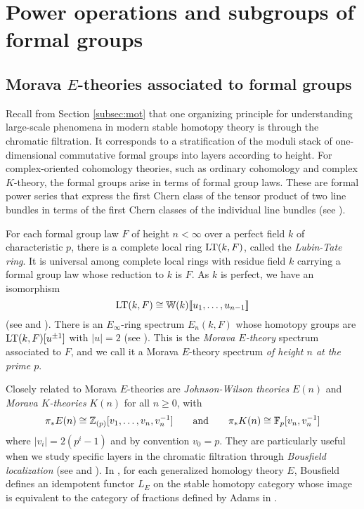 \documentclass{gtpart}
\theoremstyle{definition}
\theoremstyle{remark}
\newcommand{\mb}[1]{\mathbb{#1}}
\newcommand{\LT}{{\rm LT}}
\newcommand{\BF}{{\mb F}}
\newcommand{\BW}{{\mb W}}
\newcommand{\BZ}{{\mb Z}}
\newcommand{\ad}{{\rm and}}
\numberwithin{equation}{section}
\numberwithin{thm}{section}
\begin{document}
\section{Power operations and subgroups of formal groups}
\label{sec:fg}

\subsection{Morava $E$-theories associated to formal groups}
\label{subsec:E}

Recall from Section \ref{subsec:mot} that one organizing principle for 
understanding large-scale phenomena in modern stable homotopy theory is 
through the chromatic filtration.  It corresponds to a stratification of 
the moduli stack of one-dimensional commutative formal groups into 
layers according to height.  For complex-oriented cohomology theories, 
such as ordinary cohomology and complex $K$-theory, the formal groups 
arise in terms of formal group laws.  These are formal power series that 
express the first Chern class of the tensor product of two line bundles 
in terms of the first Chern classes of the individual line bundles (see 
\cite[Section 1]{coctalos}).  

For each formal group law $F$ of height $n<\infty$ over a perfect field 
$k$ of characteristic $p$, there is a complete local ring $\LT(k,F)$, 
called the {\em Lubin-Tate ring}.  It is universal among complete local 
rings with residue field $k$ carrying a formal group law whose reduction 
to $k$ is $F$.  As $k$ is perfect, we have an isomorphism 
\[
 \LT(k,F) \cong \BW(k) \llbracket u_1,\ldots,u_{n-1} \rrbracket 
\]
(see \cite{lubintate} and \cite[Sections 4.3 and 4.5]{Rnotes}).  There 
is an $E_\infty$-ring spectrum $E_n(k,F)$ whose homotopy groups are 
$\LT(k,F)[u^{\pm1}]$ with $|u| = 2$ (see 
\cite[Corollary 7.6]{goersshopkins}).  This is the {\em Morava 
$E$-theory} spectrum associated to $F$, and we call it a Morava 
$E$-theory spectrum {\em of height $n$ at the prime $p$}.  

Closely related to Morava $E$-theories are {\em Johnson-Wilson theories} 
$E(n)$ and {\em Morava $K$-theories} $K(n)$ for all $n \geq 0$, with 
\[
 \pi_*E(n) \cong \BZ_{(p)}[v_1,\ldots,v_n,v_n^{-1}] \qquad \ad \qquad 
 \pi_*K(n) \cong \BF_p[v_n,v_n^{-1}] 
\]
where $|v_i| = 2(p^i-1)$ and by convention $v_0 = p$.  They are 
particularly useful when we study specific layers in the chromatic 
filtration through {\em Bousfield localization} (see 
\cite[Chapter 7]{orange} and \cite[Lectures 20-23]{252x}).  In 
\cite{bousfield}, for each generalized homology theory $E$, Bousfield 
defines an idempotent functor $L_E$ on the stable homotopy category 
whose image is equivalent to the category of fractions defined by Adams 
in \cite[Section III.14]{sh}.  
\end{document}
